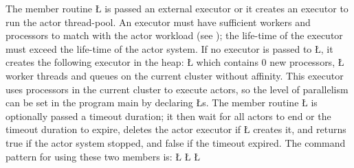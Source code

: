 \documentclass[openright,twoside]{report}
\begin{document}
The member routine \LGinlinetrue\LGbegin\lgrinde\L{}\endlgrinde\LGend{} is passed an external executor or it creates an executor to run the actor thread-pool.
An executor must have sufficient workers and processors to match with the actor workload (see );
the life-time of the executor must exceed the life-time of the actor system.
If no executor is passed to \LGinlinetrue\LGbegin\lgrinde\L{}\endlgrinde\LGend{}, it creates the following executor in the heap:
\LGinlinefalse\LGbegin\lgrinde
\L{}
\endlgrinde\LGend
which contains 0 new processors, \LGinlinetrue\LGbegin\lgrinde\L{}\endlgrinde\LGend{} worker threads and queues on the current cluster without affinity.
This executor uses processors in the current cluster to execute actors, so the level of parallelism can be set in the program main by declaring \LGinlinetrue\LGbegin\lgrinde\L{}\endlgrinde\LGend{}s.
The member routine \LGinlinetrue\LGbegin\lgrinde\L{}\endlgrinde\LGend{} is optionally passed a timeout duration;
it then wait for all actors to end or the timeout duration to expire, deletes the actor executor if \LGinlinetrue\LGbegin\lgrinde\L{}\endlgrinde\LGend{} creates it, and returns true if the actor system stopped, and false if the timeout expired.
The command pattern for using these two members is:
\LGinlinefalse\LGbegin\lgrinde
\L{}
\CE{}\L{}
\CE{}\L{}
\CE{}\endlgrinde\LGend
\end{document}
